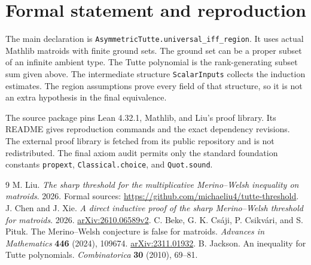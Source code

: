 \documentclass[11pt,a4paper]{article}
\begin{document}
\section{Formal statement and reproduction}
The main declaration is \texttt{AsymmetricTutte.universal\_iff\_region}.
It uses actual Mathlib matroids with finite ground sets. The ground set
can be a proper subset of an infinite ambient type.
The Tutte polynomial is the rank-generating subset sum given above.
The intermediate structure \texttt{ScalarInputs} collects the induction
estimates. The region assumptions prove every field of that structure,
so it is not an extra hypothesis in the final equivalence.

The source package pins Lean 4.32.1, Mathlib, and Liu's proof library.
Its README gives reproduction commands and the exact dependency revisions.
The external proof library is fetched from its public repository and is
not redistributed. The final axiom audit permits only the standard
foundation constants \texttt{propext}, \texttt{Classical.choice}, and
\texttt{Quot.sound}.


\begin{thebibliography}{9}
 M. Liu. \emph{The sharp threshold for the multiplicative
Merino--Welsh inequality on matroids}. 2026.
Formal sources: \url{https://github.com/michaeliu4/tutte-threshold}.
 J. Chen and J. Xie. \emph{A direct inductive proof of the sharp
Merino--Welsh threshold for matroids}. 2026.
\href{https://arxiv.org/abs/2610.06589}{arXiv:2610.06589v2}.
 C. Beke, G. K. Cs\'aji, P. Csikv\'ari, and S. Pituk.
The Merino--Welsh conjecture is false for matroids.
\emph{Advances in Mathematics} \textbf{446} (2024), 109674.
\href{https://arxiv.org/abs/2311.01932}{arXiv:2311.01932}.
 B. Jackson. An inequality for Tutte polynomials.
\emph{Combinatorica} \textbf{30} (2010), 69--81.
\end{thebibliography}
\end{document}
